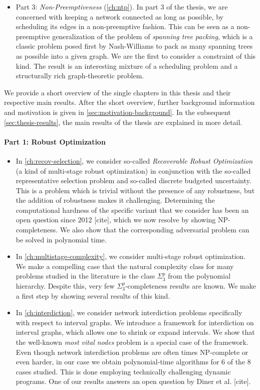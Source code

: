 \begin{itemize}
\item Part 3: \emph{Non-Preemptiveness} (\cref{ch:ntp}). In part 3 of the thesis, we are concerned with keeping a network connected as long as possible, by scheduling its edges in a non-preemptive fashion.
This can be seen as a non-preemptive generalization of the problem of \emph{spanning tree packing}, which is a classic problem posed first by Nash-Williams to pack as many spanning trees as possible into a given graph. We are the first to consider a constraint of this kind. The result is an interesting mixture of a scheduling problem and a structurally rich graph-theoretic problem.
\end{itemize}

We provide a short overview of the single chapters in this thesis and their respective main results. After the short overview, further background information and motivation is given in \cref{sec:motivation-background}. In the subsequent  \cref{sec:thesis-results}, the main results of the thesis are explained in more detail.

\paragraph*{Part 1: Robust Optimization}
\begin{itemize}
\item In \cref{ch:recov-selection}, we consider so-called \emph{Recoverable Robust Optimization} (a kind of multi-stage robust optimization) in conjunction with the so-called representative selection problem and so-called discrete budgeted uncertainty. 
This is a problem which is trivial without the presence of any robustness, but the addition of robustness makes it challenging. 
Determining the computational hardness of the specific variant that we consider has been an open question since 2012 [cite], which we now resolve by showing NP-completeness. 
We also show that the corresponding adversarial problem can be solved in polynomial time.

\item   In \cref{ch:multistage-complexity}, we consider multi-stage robust optimization. We make a compelling case that the natural complexity class for many problems studied in the literature is the class $\Sigma^p_3$ from the polynomial hierarchy. Despite this, very few $\Sigma^p_3$-completeness results are known. We make a first step by showing several results of this kind.

\item In \cref{ch:interdiction}, we consider network interdiction problems specifically with respect to interval graphs. We introduce a framework for interdiction on interval graphs, which allows one to shrink or expand intervals. We show that the well-known \emph{most vital nodes} problem is a special case of the framework. Even though network interdiction problems are often times NP-complete or even harder, in our case we obtain polynomial-time algorithms for 6 of the 8 cases studied. This is done employing technically challenging dynamic programs. One of our results answers an open question by Diner et al. [cite].
\end{itemize}

